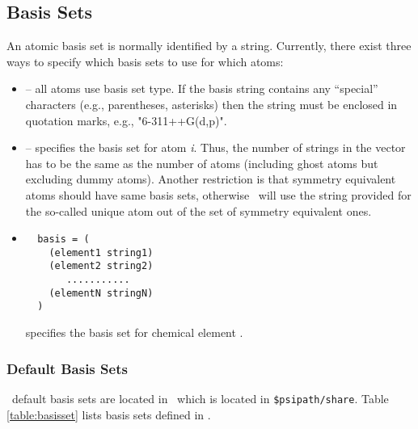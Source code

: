 \subsection{Basis Sets}
An atomic basis set is normally identified by a
string. Currently, there exist three ways to specify which basis sets
to use for which atoms:
\begin{itemize}
\item {} -- all atoms use basis set type.  If the
basis string contains any ``special'' characters (e.g., parentheses, 
asterisks) then the string must be enclosed in quotation marks, e.g.,
"6-311++G(d,p)".
\item {} -- 
specifies the basis set for atom {\em i}. Thus, the number of strings
in the  vector has to be the same as the number of
atoms (including ghost atoms but excluding dummy atoms). Another
restriction is that symmetry equivalent atoms should have same basis
sets, otherwise \PSIinput\ will use the string provided for the
so-called unique atom out of the set of symmetry equivalent ones.
\item 
\begin{verbatim}
  basis = (
    (element1 string1)
    (element2 string2)
       ...........
    (elementN stringN)
  )
\end{verbatim}
 specifies the basis set for chemical element 
.
\end{itemize}

\subsubsection{Default Basis Sets}
\PSIthree\ default basis sets are located in \pbasisdat\ which is located in
{\tt \$psipath/share}. Table \ref{table:basisset} lists basis sets
defined in \pbasisdat.

